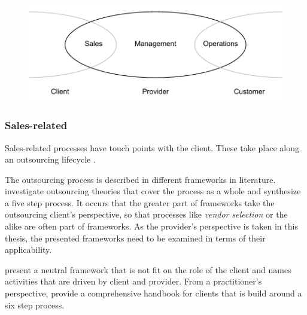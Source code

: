	
	\begin{figure}[caption={BPO Chain Provider Scope with Stakeholders}, label={fig:bpochainscope}]
		{	\includegraphics[width=.8\textwidth]{figures/chain2.pdf}}
	\end{figure} 
	
	\subsubsection{Sales-related}
	\label{sec:srproc}
	Sales-related processes have touch points with the client. These take place along an outsourcing lifecycle \citep{Babin_2016}.
	
	The outsourcing process is described in different frameworks in literature. \cite{perunovic2007outsourcing} investigate outsourcing theories that cover the process as a whole and synthesize a five step process. It occurs that the greater part of frameworks take the outsourcing client's perspective, so that processes like \textit{vendor selection} or the alike are often part of frameworks. As the provider's perspective is taken in this thesis, the presented frameworks need to be examined in terms of their applicability.
	
	\cite{Agarwal_2008} present a neutral framework that is not fit on the role of the client and names activities that are driven by client and provider. From a practitioner's perspective, \cite{deloittehandbook} provide a comprehensive handbook for clients that is build around a six step process. 
	
	
	
